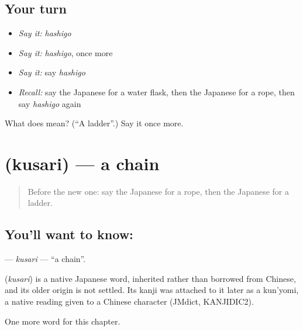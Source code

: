 \subsection*{Your turn}
\begin{itemize}
\raggedright
  \item \emph{Say it:} \emph{hashigo}
  \item \emph{Say it:} \emph{hashigo}, once more
  \item \emph{Say it:} say \emph{hashigo}
  \item \emph{Recall:} say the Japanese for a water flask, then the Japanese for a rope, then say \emph{hashigo} again
\end{itemize}

\begin{tcolorbox}[breakable,colback=teal!4,colframe=teal!35!black,title={Before you move on}]
What does  mean? (\textquotedblleft{}A ladder\textquotedblright{}.) Say it once more.
\end{tcolorbox}
\section[\texorpdfstring{\ja{くさり} (kusari)}{くさり (kusari)}]{ (kusari) — a chain}

\label{lesson:JA-C118-kusari}



\begin{quote}
Before the new one: say the Japanese for a rope, then the Japanese for a ladder.
\end{quote}

\subsection*{You'll want to know: }
\textbf{} — \emph{kusari} — \textquotedblleft{}a chain\textquotedblright{}.

\begin{cousinweb}
\textbf{} (\emph{kusari}) is a native Japanese word, inherited rather than borrowed from Chinese, and its older origin is not settled. Its kanji was attached to it later as a kun'yomi, a native reading given to a Chinese character (JMdict, KANJIDIC2).
\end{cousinweb}

\begin{grammarlens}[title={What you've built}]
One more word for this chapter.
\end{grammarlens}

